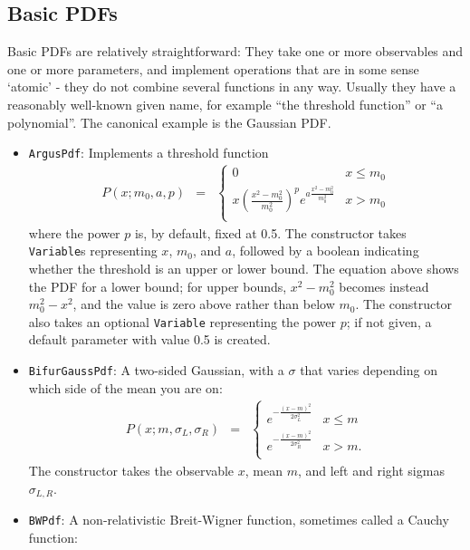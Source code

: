 \documentclass[12pt,pdflatex]{article}
\begin{document}
\subsection{Basic PDFs}

Basic PDFs are relatively straightforward: They take one or more observables
and one or more parameters, and implement operations that are in some sense
`atomic' - they do not combine several functions in any way. Usually they have
a reasonably well-known given name, for example ``the threshold function'' or ``a polynomial''. 
The canonical example is the Gaussian PDF. 

\begin{itemize}
\item \texttt{ArgusPdf}: Implements a threshold function
\begin{eqnarray}
P(x;m_0,a,p) &=& \left\{ \begin{matrix}
0 & x \le m_0 \\
x\left(\frac{x^2-m_0^2}{m_0^2}\right)^p e^{a\frac{x^2-m_0^2}{m_0^2}} & x > m_0 \\
\end{matrix}
\right. 
\end{eqnarray}
where the power $p$ is, by default, fixed at 0.5. The constructor takes \texttt{Variable}s
representing $x$, $m_0$,
and $a$, followed by a boolean indicating whether the threshold is an upper or lower
bound. The equation above shows the PDF for a lower bound; for upper bounds, $x^2-m_0^2$
becomes instead $m_0^2-x^2$, and the value is zero above rather than below $m_0$. 
The constructor also takes an optional \texttt{Variable} representing the power $p$;
if not given, a default parameter with value 0.5 is created. 
\item \texttt{BifurGaussPdf}: A two-sided Gaussian, with a $\sigma$ that
varies depending on which side of the mean you are on: 
\begin{eqnarray}
P(x;m,\sigma_L,\sigma_R) &=& \left\{ \begin{matrix}
e^{-\frac{(x-m)^2}{2\sigma_L^2}} & x \le m \\
e^{-\frac{(x-m)^2}{2\sigma_R^2}} & x > m. \\
\end{matrix}
\right. 
\end{eqnarray}
The constructor takes the observable $x$, mean $m$, and left and right sigmas
$\sigma_{L,R}$.
\item \texttt{BWPdf}: A non-relativistic Breit-Wigner function,
sometimes called a Cauchy function:
\begin{eqnarray}

\end{eqnarray}
\end{itemize}
\end{document}
